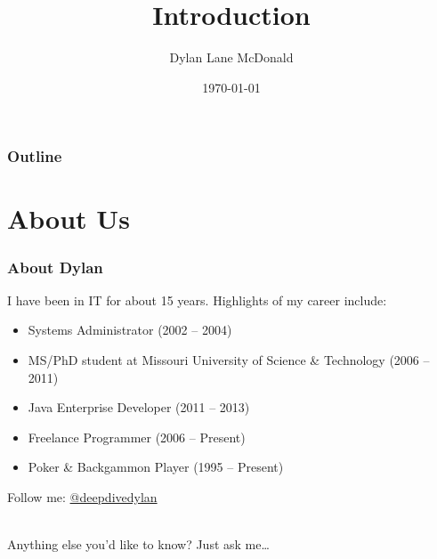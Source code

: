 \documentclass[aspectratio=169]{beamer}
\title{Introduction}
\author{Dylan Lane McDonald}
\institute{CNM STEMulus Center\\Web Development with PHP}
\date{\today}
\begin{document}
\begin{frame}
\titlepage
\end{frame}

\begin{frame}
\frametitle{Outline}
\tableofcontents
\end{frame}

\section{About Us}
\begin{frame}
\frametitle{About Dylan}
I have been in IT for about 15 years. Highlights of my  career include:
\begin{itemize}
	\item Systems Administrator (2002 -- 2004)
	\item MS/PhD student at Missouri University of Science \& Technology (2006 -- 2011)
	\item Java Enterprise Developer (2011 -- 2013)
	\item Freelance Programmer (2006 -- Present)
	\item Poker \& Backgammon Player (1995 -- Present)
\end{itemize}
Follow me:  \href{https://twitter.com/deepdivedylan}{@deepdivedylan}

\mbox{}\\
Anything else you'd like to know? Just ask me\dots
\end{frame}
\end{document}
